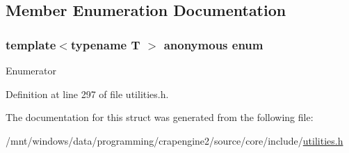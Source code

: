 \subsection{Member Enumeration Documentation}
\hypertarget{structcrap_1_1align__of_ae6e1e0ba0f4e74c10d92aa8849e230e5}{}\subsubsection[{anonymous enum}]{\setlength{\rightskip}{0pt plus 5cm}template$<$typename T $>$ anonymous enum}\label{structcrap_1_1align__of_ae6e1e0ba0f4e74c10d92aa8849e230e5}
\begin{Desc}
\item[Enumerator]\par
\begin{description}
\item[{\em 
\hypertarget{structcrap_1_1align__of_ae6e1e0ba0f4e74c10d92aa8849e230e5a8b5c1072cbffe59ec024940bd1bcbe2b}{}size\label{structcrap_1_1align__of_ae6e1e0ba0f4e74c10d92aa8849e230e5a8b5c1072cbffe59ec024940bd1bcbe2b}
}]\item[{\em 
\hypertarget{structcrap_1_1align__of_ae6e1e0ba0f4e74c10d92aa8849e230e5a681bb33919188c1863cff58c23b72e69}{}value\label{structcrap_1_1align__of_ae6e1e0ba0f4e74c10d92aa8849e230e5a681bb33919188c1863cff58c23b72e69}
}]\end{description}
\end{Desc}


Definition at line 297 of file utilities.\+h.



The documentation for this struct was generated from the following file\+:\begin{DoxyCompactItemize}
\item 
/mnt/windows/data/programming/crapengine2/source/core/include/\hyperlink{utilities_8h}{utilities.\+h}\end{DoxyCompactItemize}
